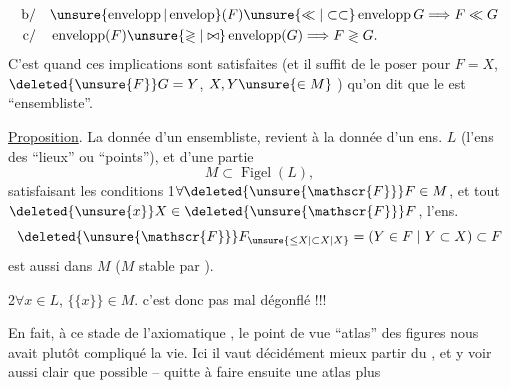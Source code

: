 \[
\begin{aligned}
\text{b/}\quad &\unsure{\operatorname{envelopp}|\operatorname{envelop}}(F)\unsure{\ll|\subset\subset}\operatorname{envelopp}G\Longrightarrow F\ll G\\
\text{c/}\quad &\operatorname{envelopp}(F)\unsure{\gtrless|\bowtie}\operatorname{envelopp}(G)\Longrightarrow F\gtrless G.
\end{aligned}
\]
C'est quand ces  implications sont satisfaites  (et il suffit de le poser pour $F=X$, $\deleted{\unsure{F}}G=Y$, $X,Y\unsure{\in M}$ ) qu'on dit que le  est ``ensembliste''.


\uline{Proposition}. La donnée d'un  ensembliste,  revient à la donnée d'un ens. $L$ (l'ens des ``lieux'' ou ``points''), et d'une partie
\[
M\subset\operatorname{Figel}(L),
\]
satisfaisant les conditions
\uline{} 1\quad $\forall\deleted{\unsure{\mathscr{F}}}F\in M$, et tout $\deleted{\unsure{x}}X\in\deleted{\unsure{\mathscr{F}}}F$, l'ens.
\[
\deleted{\unsure{\mathscr{F}}}F_{\unsure{\leq X|\subset X|X}}=(Y\in F\mid Y\subset X)\subset F
\]
est aussi dans $M$ ($M$ stable par ).

\uline{} 2\quad $\forall x\in L$, $\{\{x\}\}\in M$.
 c'est donc pas mal dégonflé !!!

En fait, à ce stade de l'axiomatique , le point de vue ``atlas'' des figures nous avait plutôt compliqué la vie. Ici il vaut décidément mieux partir du , et y voir aussi clair que possible -- quitte à faire ensuite une    atlas plus

